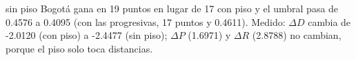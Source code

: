 {sin piso Bogotá gana en 19 puntos en lugar de 17 con piso y el umbral pasa de 0.4576 a 0.4095 (con las progresivas, 17 puntos y 0.4611).}
{Medido: $\Delta D$ cambia de -2.0120 (con piso) a -2.4477 (sin piso); $\Delta P$ (1.6971) y $\Delta R$ (2.8788) no cambian, porque el piso solo toca distancias.}
